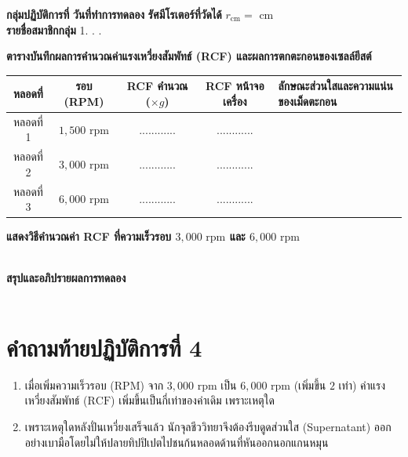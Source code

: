 \begin{worksheetbox}
\noindent\textbf{กลุ่มปฏิบัติการที่} \dotfill \textbf{วันที่ทำการทดลอง} \dotfill \textbf{รัศมีโรเตอร์ที่วัดได้} $r_{\text{cm}} = $ \dotfill $\text{cm}$\\[4pt]
\noindent\textbf{รายชื่อสมาชิกกลุ่ม} 1. . . \dotfill

\vspace{6pt}
\noindent\textbf{ตารางบันทึกผลการคำนวณค่าแรงเหวี่ยงสัมพัทธ์ (RCF) และผลการตกตะกอนของเซลล์ยีสต์}
\begin{center}
\footnotesize\setlength{\tabcolsep}{3.5pt}
\begin{tabularx}{\linewidth}{c c c c >{\raggedright\arraybackslash}X}
\toprule
\textbf{หลอดที่} & \textbf{รอบ (RPM)} & \textbf{RCF คำนวณ ($\times g$)} & \textbf{RCF หน้าจอเครื่อง} & \textbf{ลักษณะส่วนใสและความแน่นของเม็ดตะกอน} \\
\midrule
หลอดที่ 1 & $1{,}500\text{ rpm}$ & ............ & ............ & \dotfill \\
หลอดที่ 2 & $3{,}000\text{ rpm}$ & ............ & ............ & \dotfill \\
หลอดที่ 3 & $6{,}000\text{ rpm}$ & ............ & ............ & \dotfill \\
\bottomrule
\end{tabularx}
\end{center}

\vspace{4pt}
\noindent\textbf{แสดงวิธีคำนวณค่า RCF ที่ความเร็วรอบ $3{,}000\text{ rpm}$ และ $6{,}000\text{ rpm}$}\\[4pt]
\dotfill\\[6pt]
\dotfill

\noindent\textbf{สรุปและอภิปรายผลการทดลอง}\\[4pt]
\dotfill\\[6pt]
\dotfill
\end{worksheetbox}

\section*{คำถามท้ายปฏิบัติการที่ 4}
\begin{enumerate}
    \item เมื่อเพิ่มความเร็วรอบ ($\text{RPM}$) จาก $3{,}000\text{ rpm}$ เป็น $6{,}000\text{ rpm}$ (เพิ่มขึ้น $2$ เท่า) ค่าแรงเหวี่ยงสัมพัทธ์ ($\text{RCF}$) เพิ่มขึ้นเป็นกี่เท่าของค่าเดิม เพราะเหตุใด
    \item เพราะเหตุใดหลังปั่นเหวี่ยงเสร็จแล้ว นักจุลชีววิทยาจึงต้องรีบดูดส่วนใส (Supernatant) ออกอย่างเบามือโดยไม่ให้ปลายทิปปิเปตไปชนก้นหลอดด้านที่หันออกนอกแกนหมุน
\end{enumerate}
